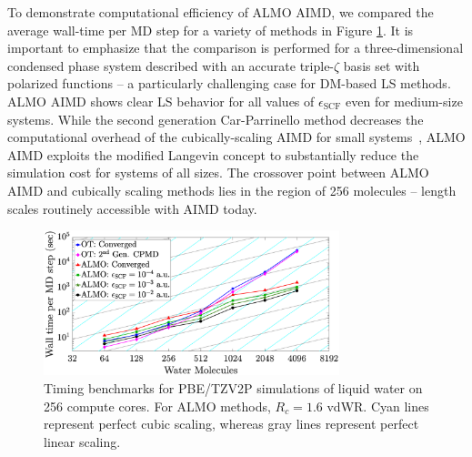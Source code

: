 \documentclass[aps,prl,reprint,amsmath,amssymb]{revtex4-1}
\begin{document}


To demonstrate computational efficiency of ALMO AIMD, we compared the average wall-time per MD step for a variety of methods in Figure \ref{fig:strongscaling_log}.
It is important to emphasize that the comparison is performed for a three-dimensional condensed phase system described with an accurate triple-$\zeta$ basis set with polarized functions -- a particularly challenging case for DM-based LS methods.
ALMO AIMD shows clear LS behavior for all values of $\epsilon_{\text{SCF}}$ even for medium-size systems. While the second generation Car-Parrinello method decreases the computational overhead of the cubically-scaling AIMD for small systems~\cite{a:2ndcpmd}, ALMO AIMD exploits the modified Langevin concept to substantially reduce the simulation cost for systems of all sizes.
The crossover point between ALMO AIMD and cubically scaling methods lies in the region of 256 molecules -- length scales routinely accessible with AIMD today. 


\begin{figure}
\includegraphics[trim={2.5cm 0.5cm 3.4cm 0.9cm},clip,width=8.6cm]{strongscaling_log.eps}
\caption{\label{fig:strongscaling_log} Timing benchmarks for PBE/TZV2P simulations of liquid water on 256 compute cores. 
For ALMO methods, $R_{c} = 1.6$ vdWR. 
Cyan lines represent perfect cubic scaling, whereas gray lines represent perfect linear scaling. 
}
\end{figure}
\end{document}

